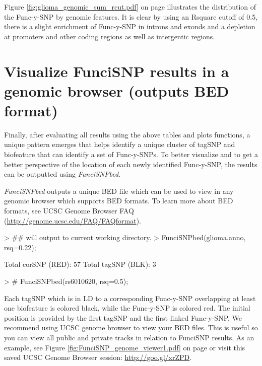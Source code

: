 \documentclass[12pt,fullpage]{article}
\newcommand{\Rmethod}[1]{{\textit{#1}}}
\begin{document}
Figure \ref{fig:glioma_genomic_sum_rcut.pdf} on page                             
\pageref{fig:glioma_genomic_sum_rcut.pdf} illustrates the distribution of the       
Func-y-SNP by genomic features. It is clear by using an Rsquare cutoff of 0.5,   
        there is a slight enrichment of Func-y-SNP in introns and exonds and a          
            depletion at promoters and other coding regions as well as
            intergentic       
                regions.

\newpage


\section{Visualize FunciSNP results in a genomic browser (outputs BED format)}

Finally, after evaluating all results using the above tables and plots
functions, a unique pattern emerges that helps identify a unique cluster of
tagSNP and biofeature that can identify a set of Func-y-SNPs. To better
visualize and to get a better perspective of the location of each newly
identified Func-y-SNP, the results can be outputted using \Rmethod{FunciSNPbed}.

\Rmethod{FunciSNPbed} outputs a unique BED file which can be used to view in any
genomic browser which supports BED formats. To learn more about BED formats, see
UCSC Genome Browser FAQ (\url{http://genome.ucsc.edu/FAQ/FAQformat}). 

\begin{Schunk}
\begin{Sinput}
> ## will output to current working directory.
> FunciSNPbed(glioma.anno, rsq=0.22);
\end{Sinput}
\begin{Soutput}
Total corSNP (RED):  57 
Total tagSNP (BLK):  3 
\end{Soutput}
\begin{Sinput}
> # FunciSNPbed(rs6010620, rsq=0.5);
\end{Sinput}
\end{Schunk}

Each tagSNP which is in LD to a corresponding Func-y-SNP overlapping at least
one biofeature is colored black, while the Func-y-SNP is colored red. The
initial position is provided by the first tagSNP and the first linked
Func-y-SNP. We recommend using UCSC genome browser to view your BED files. This
is useful so you can view all public and private tracks in relation to FunciSNP
results. As an example, see Figure \ref{fig:FunciSNP_genome_viewer1.pdf} on page
\pageref{fig:FunciSNP_genome_viewer1.pdf} or visit this saved UCSC Genome
Browser session: \url{http://goo.gl/xrZPD}.
\end{document}
